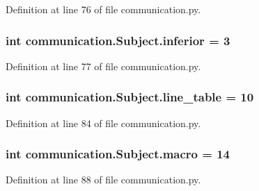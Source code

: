 Definition at line 76 of file communication.\+py.

\hypertarget{classcommunication_1_1Subject_ad4720f1f960a09acb9a0f245ac678cef}{}
\subsubsection[{inferior}]{\setlength{\rightskip}{0pt plus 5cm}int communication.\+Subject.\+inferior = 3\hspace{0.3cm}{\ttfamily [static]}}\label{classcommunication_1_1Subject_ad4720f1f960a09acb9a0f245ac678cef}


Definition at line 77 of file communication.\+py.

\hypertarget{classcommunication_1_1Subject_a78892a277ffa04513a6979b5a0ade608}{}
\subsubsection[{line\+\_\+table}]{\setlength{\rightskip}{0pt plus 5cm}int communication.\+Subject.\+line\+\_\+table = 10\hspace{0.3cm}{\ttfamily [static]}}\label{classcommunication_1_1Subject_a78892a277ffa04513a6979b5a0ade608}


Definition at line 84 of file communication.\+py.

\hypertarget{classcommunication_1_1Subject_a8d276dea7a38b2cd749e968b41b00cd9}{}
\subsubsection[{macro}]{\setlength{\rightskip}{0pt plus 5cm}int communication.\+Subject.\+macro = 14\hspace{0.3cm}{\ttfamily [static]}}\label{classcommunication_1_1Subject_a8d276dea7a38b2cd749e968b41b00cd9}


Definition at line 88 of file communication.\+py.

\hypertarget{classcommunication_1_1Subject_afc18bbd6bdad22358b66e6a165299ffb}{}
